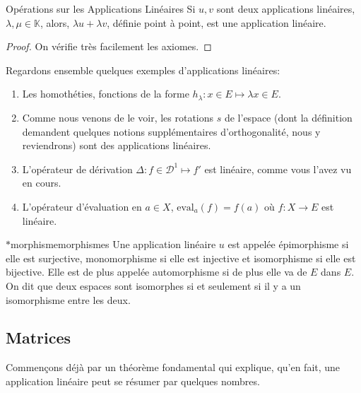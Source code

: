 \documentclass{classe}
\renewcommand*{\K}{\mathbb{K}}
\begin{document}
\begin{propositionfr}{Opérations sur les Applications Linéaires}{}
	Si $u, v$ sont deux applications linéaires, $\lambda, \mu \in \K$, alors, $\lambda u + \lambda v$, définie point à point, est une application linéaire.
\end{propositionfr}
\begin{proof}
	On vérifie très facilement les axiomes.
\end{proof}

\begin{example}
	Regardons ensemble quelques exemples d'applications linéaires:
	\begin{enumerate}
		\item Les homothéties, fonctions de la forme $h_{\lambda}: x \in E \mapsto \lambda x \in E$.
		\item Comme nous venons de le voir, les rotations $s$ de l'espace (dont la définition demandent quelques notions supplémentaires d'orthogonalité, nous y reviendrons) sont des applications linéaires.
		\item L'opérateur de dérivation $\Delta: f \in \mathcal{D}^{1} \mapsto f'$ est linéaire, comme vous l'avez vu en cours.
		\item L'opérateur d'évaluation en $a \in X$, $\mathrm{eval}_{a}\left( f \right) = f(a)$ où $f: X \to E$ est linéaire.
	\end{enumerate}
\end{example}

\begin{définition}{$*$morphisme}{morphismes}
	Une application linéaire $u$ est appelée épimorphisme si elle est surjective, monomorphisme si elle est injective et isomorphisme si elle est bijective.
	Elle est de plus appelée automorphisme si de plus elle va de $E$ dans $E$.
	On dit que deux espaces sont isomorphes si et seulement si il y a un isomorphisme entre les deux.
\end{définition}


\subsection{Matrices}
Commençons déjà par un théorème fondamental qui explique, qu'en fait, une application linéaire peut se résumer par quelques nombres.
\end{document}
